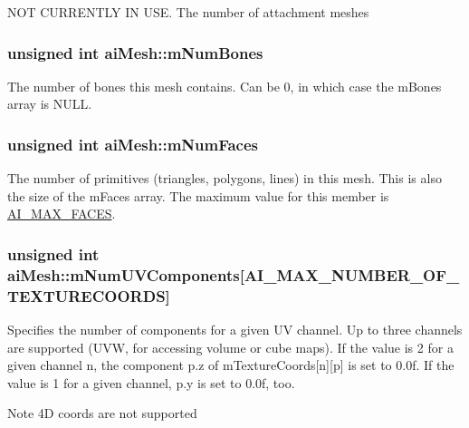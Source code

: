 \-N\-O\-T \-C\-U\-R\-R\-E\-N\-T\-L\-Y \-I\-N \-U\-S\-E. \-The number of attachment meshes \hypertarget{structaiMesh_a0f9d5425b6300e32a842a94f943fd79e}{
\subsubsection[{m\-Num\-Bones}]{\setlength{\rightskip}{0pt plus 5cm}unsigned int {\bf ai\-Mesh\-::m\-Num\-Bones}}}\label{structaiMesh_a0f9d5425b6300e32a842a94f943fd79e}
\-The number of bones this mesh contains. \-Can be 0, in which case the m\-Bones array is \-N\-U\-L\-L. \hypertarget{structaiMesh_aeed22ee6963b79548f3877b3c905518e}{
\subsubsection[{m\-Num\-Faces}]{\setlength{\rightskip}{0pt plus 5cm}unsigned int {\bf ai\-Mesh\-::m\-Num\-Faces}}}\label{structaiMesh_aeed22ee6963b79548f3877b3c905518e}
\-The number of primitives (triangles, polygons, lines) in this mesh. \-This is also the size of the m\-Faces array. \-The maximum value for this member is \hyperlink{mesh_8h_aef69217e80411f3fee5aae3dc06b68ba}{\-A\-I\-\_\-\-M\-A\-X\-\_\-\-F\-A\-C\-E\-S}. \hypertarget{structaiMesh_a635c631a6e66d32989d6b25b2a892d86}{
\subsubsection[{m\-Num\-U\-V\-Components}]{\setlength{\rightskip}{0pt plus 5cm}unsigned int {\bf ai\-Mesh\-::m\-Num\-U\-V\-Components}\mbox{[}{\bf \-A\-I\-\_\-\-M\-A\-X\-\_\-\-N\-U\-M\-B\-E\-R\-\_\-\-O\-F\-\_\-\-T\-E\-X\-T\-U\-R\-E\-C\-O\-O\-R\-D\-S}\mbox{]}}}\label{structaiMesh_a635c631a6e66d32989d6b25b2a892d86}
\-Specifies the number of components for a given \-U\-V channel. \-Up to three channels are supported (\-U\-V\-W, for accessing volume or cube maps). \-If the value is 2 for a given channel n, the component p.\-z of m\-Texture\-Coords\mbox{[}n\mbox{]}\mbox{[}p\mbox{]} is set to 0.\-0f. \-If the value is 1 for a given channel, p.\-y is set to 0.\-0f, too. \begin{DoxyNote}{\-Note}
4\-D coords are not supported 
\end{DoxyNote}
